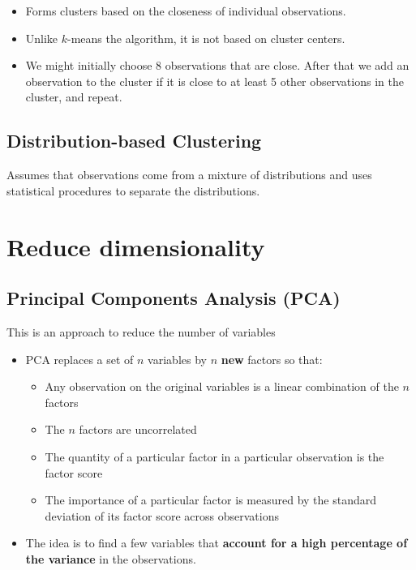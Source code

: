 \begin{itemize}
    \item Forms clusters based on the closeness of individual observations.
    \item Unlike $k$-means the algorithm, it is not based on cluster centers.
    \item We might initially choose 8 observations that are close. After that we add an observation to the cluster if it is close to at least 5 other observations in the cluster, and repeat. 
\end{itemize}

\subsection{Distribution-based Clustering}

Assumes that observations come from a mixture of distributions and uses statistical procedures to separate the distributions.

\section{Reduce dimensionality}

\subsection{Principal Components Analysis (PCA)}

This is an approach to reduce the number of variables
\begin{itemize}
    \item PCA replaces a set of $n$ variables by $n$ \textbf{new} factors so that:
          \begin{itemize}
              \item Any observation on the original variables is a linear combination of the $n$ factors
              \item The $n$ factors are uncorrelated
              \item The quantity of a particular factor in a particular observation is the factor score
              \item The importance of a particular factor is measured by the standard deviation of its factor score across observations \ 
          \end{itemize}
    \item The idea is to find a few variables that \textbf{account for a high percentage of the variance} in the observations.
\end{itemize}

